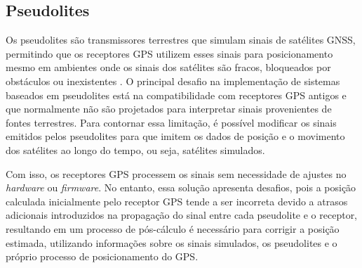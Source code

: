 
\subsection{Pseudolites}

Os pseudolites são transmissores terrestres que simulam sinais de satélites GNSS, permitindo que os receptores GPS utilizem esses sinais para posicionamento mesmo em ambientes onde os sinais dos satélites são fracos, bloqueados por obstáculos ou inexistentes \cite{kim2014}.
O principal desafio na implementação de sistemas baseados em pseudolites está na compatibilidade com receptores GPS antigos e que normalmente não são projetados para interpretar sinais provenientes de fontes terrestres.
Para contornar essa limitação, é possível modificar os sinais emitidos pelos pseudolites para que imitem os dados de posição e o movimento dos satélites ao longo do tempo, ou seja, satélites simulados.

Com isso, os receptores GPS processem os sinais sem necessidade de ajustes no \emph{hardware} ou \emph{firmware}.
No entanto, essa solução apresenta desafios, pois a posição calculada inicialmente pelo receptor GPS tende a ser incorreta devido a atrasos adicionais introduzidos na propagação do sinal entre cada pseudolite e o receptor, resultando em um processo de pós-cálculo é necessário para corrigir a posição estimada, utilizando informações sobre os sinais simulados, os pseudolites e o próprio processo de posicionamento do GPS.


